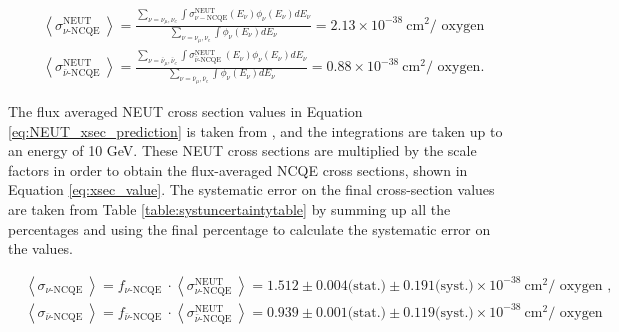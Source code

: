 \begin{equation}
    \begin{aligned}
    &\left\langle\sigma_{\nu \text {-NCQE }}^{\mathrm{NEUT}}\right\rangle= \frac{\sum_{\nu=\nu_\mu, \nu_e} \int \sigma_{\nu-\mathrm{NCQE}}^{\mathrm{NEUT}}\left(E_\nu\right) \phi_\nu\left(E_\nu\right) d E_\nu}{\sum_{\nu=\nu_\mu, \nu_e} \int \phi_\nu\left(E_\nu\right) d E_\nu}=2.13 \times 10^{-38} \mathrm{~cm}^2 / \text { oxygen } \\
    &\left\langle\sigma_{\bar{\nu} \text {-NCQE }}^{\mathrm{NEUT}}\right\rangle=\frac{\sum_{\nu=\bar{\nu}_\mu, \bar{\nu}_e} \int \sigma_{\bar{\nu} \text {-NCQE }}^{\mathrm{NEUT}}\left(E_\nu\right) \phi_\nu\left(E_\nu\right) d E_\nu}{\sum_{\nu=\bar{\nu}_\mu, \bar{\nu}_e} \int \phi_\nu\left(E_\nu\right) d E_\nu}=0.88 \times 10^{-38} \mathrm{~cm}^2 / \text { oxygen. }
    \end{aligned}
\label{eq:NEUT_xsec_prediction}
\end{equation}

The flux averaged NEUT cross section values in Equation \ref{eq:NEUT_xsec_prediction} is taken from \cite{Abe_2019}, and the integrations are taken up to an energy of 10 GeV. These NEUT cross sections are multiplied by the scale factors in order to obtain the flux-averaged NCQE cross sections, shown in Equation \ref{eq:xsec_value}. The systematic error on the final cross-section values are taken from Table \ref{table:systuncertaintytable} by summing up all the percentages and using the final percentage to calculate the systematic error on the values.


\begin{equation}
    \begin{aligned}
    & \left\langle\sigma_{\nu \text {-NCQE }}\right\rangle=f_{\nu \text {-NCQE }} \cdot\left\langle\sigma_{\nu \text {-NCQE }}^{\mathrm{NEUT}}\right\rangle=1.512 \pm 0.004 \text {(stat.)} \pm 0.191 \text {(syst.)} \times 10^{-38} \mathrm{~cm}^2 / \text { oxygen }, \\
    & \left\langle\sigma_{\bar{\nu} \text {-NCQE }}\right\rangle=f_{\bar{\nu} \text {-NCQE }} \cdot\left\langle\sigma_{\bar{\nu} \text {-NCQE }}^{\mathrm{NEUT}}\right\rangle=0.939 \pm 0.001 \text {(stat.)} \pm 0.119 \text {(syst.)} \times 10^{-38} \mathrm{~cm}^2 / \text { oxygen }
    \end{aligned}
\label{eq:xsec_value}
\end{equation}



